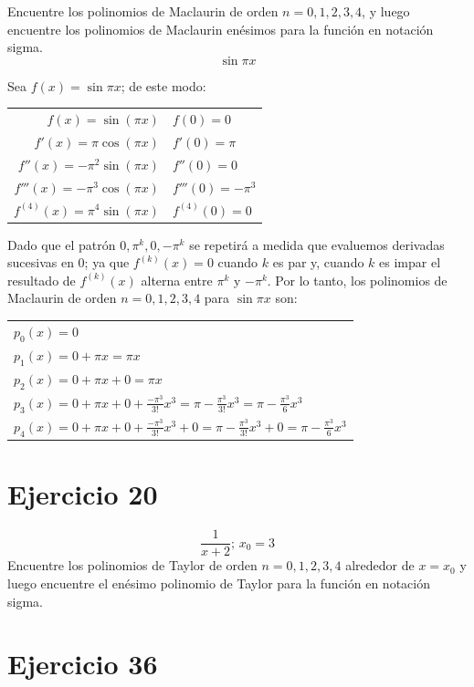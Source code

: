 \documentclass[12pt]{article}
\begin{document}
Encuentre los polinomios de Maclaurin de orden $n = 0, 1, 2, 3, 4$, y luego encuentre los polinomios de Maclaurin enésimos para la función en notación sigma.
\[\sin \pi x\]

Sea $f(x)=\sin \pi x$; de este modo:
\begin{center}
  \begin{tabular}{r l}
    $f(x)=\sin (\pi x)$ & $f(0)=0$ \\
    $f'(x)=\pi \cos (\pi x)$ & $f'(0)=\pi$ \\
    $f''(x)= - \pi ^2 \sin (\pi x)$ & $f''(0)=0$ \\
    $f'''(x)= - \pi ^3 \cos (\pi x)$ & $f'''(0)=-\pi ^3$ \\
    $f^{(4)}(x)= \pi ^4 \sin (\pi x)$ & $f^{(4)}(0)=0$ \\
  \end{tabular}
\end{center}
Dado que el patrón $0, \pi ^k, 0, -\pi ^k$ se repetirá a medida que evaluemos derivadas sucesivas en 0; ya que $f^{(k)}(x)=0$ cuando $k$ es par y, cuando $k$ es impar el resultado de $f^{(k)}(x)$ alterna entre $\pi ^k$ y $-\pi ^k$.
Por lo tanto, los polinomios de Maclaurin de orden $n = 0, 1, 2, 3, 4$ para $\sin \pi x$ son:
\begin{center}
  \begin{tabular}{l}
    $p_0(x)=0$ \\
    $p_1(x)=0+\pi x=\pi x$ \\
    $p_2(x)=0+\pi x+0=\pi x$ \\
    $p_3(x)=0+\pi x+0+\frac{-\pi ^3}{3!}x^3=\pi - \frac{\pi ^3}{3!}x^3=\pi - \frac{\pi ^3}{6}x^3$ \\
    $p_4(x)=0+\pi x+0+\frac{-\pi ^3}{3!}x^3+0=\pi - \frac{\pi ^3}{3!}x^3+0=\pi - \frac{\pi ^3}{6}x^3$ \\
  \end{tabular}
\end{center}

\section{Ejercicio 20}

\[\frac{1}{x+2}\text{; }x_0=3\]
Encuentre los polinomios de Taylor de orden $n = 0, 1, 2, 3, 4$ alrededor de $x = x_0$ y luego encuentre el enésimo polinomio de Taylor para la función en notación sigma.

\section{Ejercicio 36}
\end{document}
